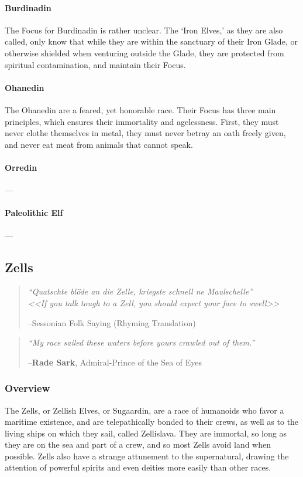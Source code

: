 \documentclass[oneside,11pt,english]{book}
\begin{document}
\paragraph*{Burdinadin}
The Focus for Burdinadin is rather unclear. The ‘Iron Elves,’ as they are also called, only know that while they are within the sanctuary of their Iron Glade, or otherwise shielded when venturing outside the Glade, they are protected from spiritual contamination, and maintain their Focus.

\paragraph*{Ohanedin}
The Ohanedin are a feared, yet honorable race. Their Focus has three main principles, which ensures their immortality and agelessness. First, they must never clothe themselves in metal, they must never betray an oath freely given, and never eat meat from animals that cannot speak.

\paragraph*{Orredin}---%

\paragraph*{Paleolithic Elf}---

\subsection{Zells}
\begin{quote}
	\centering
		\emph{“Quatschte blöde an die Zelle, kriegste schnell ne Maulschelle”}\\
		\emph{<<\emph{If you talk tough to a Zell, you should expect your face to swell}>>}\par
\hfill --Sessonian Folk Saying (Rhyming Translation)
\end{quote}

\begin{quote}
	\centering
		\emph{“My race sailed these waters before yours crawled out of them.”}\par
		\hfill --\textbf{Rade Sark}, Admiral-Prince of the Sea of Eyes
\end{quote}
 
\subsubsection*{Overview} 
The Zells, or Zellish Elves, or Sugaardin, are a race of humanoids who favor a maritime existence, and are telepathically bonded to their crews, as well as to the living ships on which they sail, called Zellislava. They are immortal, so long as they are on the sea and part of a crew, and so most Zells avoid land when possible. Zells also have a strange attunement to the supernatural, drawing the attention of powerful spirits and even deities more easily than other races. 
\end{document}
